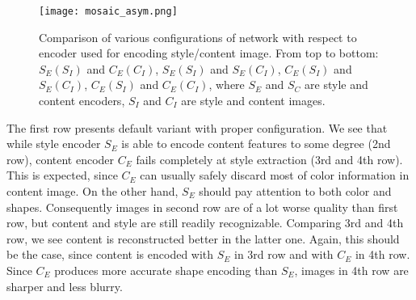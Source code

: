 \documentclass[../Main.tex]{subfiles}
\begin{document}
        \begin{figure}[h!]
        \centering
            \texttt{[image: mosaic\_asym.png]}
            \caption{Comparison of various configurations of network with respect
            to encoder used for encoding style/content image. From top to bottom:
            $S_E(S_I)$ and $C_E(C_I)$, $S_E(S_I)$ and $S_E(C_I)$,
            $C_E(S_I)$ and $S_E(C_I)$, $C_E(S_I)$ and $C_E(C_I)$, where
            $S_E$ and $S_C$ are style and content encoders, $S_I$ and $C_I$ are 
            style and content images.
            }
            \label{fig:mosaic_asym}
        \end{figure}
        
The first row presents default variant with proper configuration. 
We see that while style encoder $S_E$ is able to encode content features to some
degree (2nd row), content encoder $C_E$ fails completely at style extraction
(3rd and 4th row). This is expected, since $C_E$ can usually safely
discard most of color information in content image. On the other hand, $S_E$
should pay attention to both color and shapes. Consequently images in second row
are of a lot worse quality than first row, but content and style are still readily
recognizable. Comparing 3rd and 4th row, we see content 
is reconstructed better in the latter one. Again, this should be the case,
since content is encoded with $S_E$ in 3rd row and with $C_E$ in 4th row.
Since $C_E$ produces more accurate shape encoding than $S_E$, images in 4th row are
sharper and less blurry.
\biblio %
\end{document}
